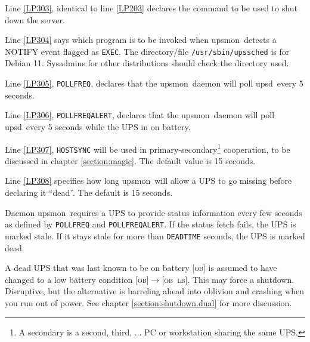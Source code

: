 \documentclass[12pt]{article}
\newcommand{\upsd}{\mbox{\textcolor{UPSDCOLOUR}{upsd}}}
\newcommand{\upsmon}{\mbox{\textcolor{MONCOLOUR}{upsmon}}}
\newcommand{\LB}{\textcolor{UPSDCOLOUR}{\textsc{lb}}}
\newcommand{\OB}{\textcolor{UPSDCOLOUR}{\textsc{ob}}}
\newcommand{\status}[1]{\textcolor{UPSDCOLOUR}{[{#1}]}}
\newcommand{\statuschange}[2]{\status{#1}{\allowbreak}\textcolor{UPSDCOLOUR}{$\rightarrow$}{\allowbreak}\status{#2}}
\begin{document}
Line \ref{LP303}, identical to line \ref{LP203} declares the command to be
used to shut down the server.

Line \ref{LP304} says which program is to be invoked when
\upsmon\ detects a NOTIFY event flagged as \texttt{EXEC}.  The
directory/file \texttt{/usr{\allowbreak}/sbin/{\allowbreak}upssched}
is for Debian 11.  Sysadmins for other distributions should check the
directory used.

Line \ref{LP305}, \texttt{POLLFREQ}, declares that the \upsmon\ daemon will
poll \upsd\ every 5 seconds.

Line \ref{LP306}, \texttt{POLLFREQALERT}, declares that the \upsmon\ daemon
will poll \upsd\ every 5 seconds while the UPS in on battery.

Line \ref{LP307}, \texttt{HOSTSYNC} will be used in primary-secondary\footnote{A
  secondary is a second, third, ... PC or workstation sharing the same UPS,}
cooperation, to be discussed in chapter \ref{section:magic}.  The default
value is 15 seconds.

Line \ref{LP308} specifies how long \upsmon\ will allow a UPS to go missing
before declaring it ``dead''. The default is 15 seconds.

Daemon \upsmon\ requires a UPS to provide status information every few seconds
as defined by \texttt{POLLFREQ} and \texttt{POLLFREQALERT}. If the status
fetch fails, the UPS is marked stale. If it stays stale for more than
\texttt{DEADTIME} seconds, the UPS is marked dead.

A dead UPS that was last known to be on battery \status{\OB} is assumed to
have changed to a low battery condition \statuschange{\OB}{\OB\ \LB}. This may
force a shutdown. Disruptive, but the alternative is barreling ahead into
oblivion and crashing when you run out of power.
See chapter \ref{section:shutdown.dual} for more discussion.
\end{document}
